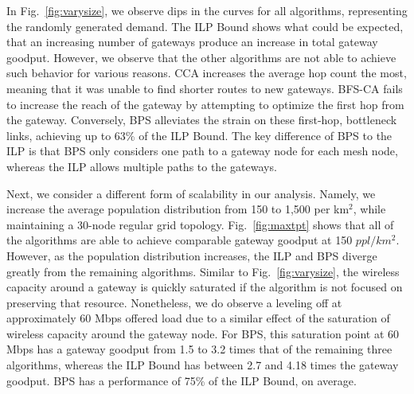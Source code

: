 
In Fig.~\ref{fig:varysize}, we observe dips in the curves for all algorithms, 
representing the randomly generated demand.  The ILP Bound shows what could be
expected, that an increasing number of gateways produce an increase in total
gateway goodput.  However, we observe that the other algorithms are not able
to achieve such behavior for various reasons.  CCA increases the average
hop count the most, meaning that it was unable to find shorter routes to new
gateways.  
BFS-CA fails to increase the reach of the gateway by attempting to optimize the first
hop from the gateway.
Conversely, BPS alleviates the strain on these first-hop, bottleneck 
links, achieving up to 63\% of the ILP Bound. The key difference of BPS to the
ILP is that BPS only considers one path to a gateway node for each mesh node,
whereas the ILP allows multiple paths to the gateways.

Next, we consider a different form of scalability in our analysis.  Namely,
we increase the average population distribution from 150 to 1,500 per km$^2$, while
maintaining a 30-node regular grid topology. Fig.~\ref{fig:maxtpt} shows that
all of the algorithms are able to achieve comparable gateway goodput at 150
$ppl/km^2$.  However, as the population distribution increases, the ILP
and BPS diverge greatly from the remaining algorithms. Similar to 
Fig.~\ref{fig:varysize}, the wireless capacity around a gateway is quickly 
saturated if the algorithm is not focused on preserving that resource. Nonetheless,
we do observe a leveling off at approximately 60 Mbps offered load due to a
similar effect of the saturation of wireless capacity around the gateway node.
For BPS, this saturation point at 60 Mbps has a gateway goodput from 1.5 to 3.2 
times that of the remaining three algorithms, whereas the ILP Bound has between
2.7 and 4.18 times the gateway goodput. BPS has a performance of 75\% of the ILP
Bound, on average.

